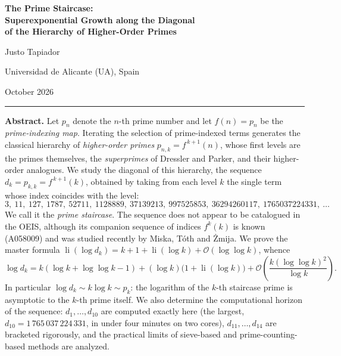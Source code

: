 \documentclass[11pt,a4paper]{article}
\theoremstyle{plain}
\theoremstyle{definition}
\newcommand{\li}{\operatorname{li}}
\begin{document}
\begin{center}
  {\LARGE\bfseries The Prime Staircase:\\[4pt]
   Superexponential Growth along the Diagonal\\[2pt]
   of the Hierarchy of Higher-Order Primes\par}
  \vspace{18pt}
  {\large Justo Tapiador\par}
  \vspace{4pt}
  {\normalsize Universidad de Alicante (UA), Spain\par}
  \vspace{10pt}
  {\small October 2026\par}
\end{center}

\vspace{6pt}
\noindent\rule{\textwidth}{0.4pt}
\vspace{4pt}

\noindent\textbf{Abstract.}
Let $p_n$ denote the $n$-th prime number and let $f(n)=p_n$ be the
\emph{prime-indexing map}. Iterating the selection of prime-indexed terms
generates the classical hierarchy of \emph{higher-order primes}
$p_{n,k}=f^{\,k+1}(n)$, whose first levels are the primes themselves, the
\emph{superprimes} of Dressler and Parker, and their higher-order analogues.
We study the diagonal of this hierarchy, the sequence
$d_k=p_{k,k}=f^{\,k+1}(k)$, obtained by taking from each level $k$ the single
term whose index coincides with the level:
\[
  3,\ 11,\ 127,\ 1787,\ 52711,\ 1128889,\ 37139213,\ 997525853,\
  36294260117,\ 1765037224331,\ \ldots
\]
We call it the \emph{prime staircase}. The sequence does not appear to be
catalogued in the OEIS, although its companion sequence of indices
$f^{k}(k)$ is known (A058009) and was studied recently by Miska, T\'oth and
\.Zmija. We prove the master formula
$\li(\log d_k)=k+1+\li(\log k)+\mathcal{O}(\log\log k)$, whence
\[
  \log d_k=k(\log k+\log\log k-1)+(\log k)\bigl(1+\li(\log k)\bigr)
  +\mathcal{O}\!\left(\frac{k(\log\log k)^2}{\log k}\right).
\]
In particular $\log d_k\sim k\log k\sim p_k$: the logarithm of the $k$-th
staircase prime is asymptotic to the $k$-th prime itself. We also determine
the computational horizon of the sequence: $d_1,\dots,d_{10}$ are computed
exactly here (the largest, $d_{10}=1\,765\,037\,224\,331$, in under four
minutes on two cores), $d_{11},\dots,d_{14}$ are bracketed rigorously, and
the practical limits of sieve-based and prime-counting-based methods are
analyzed.
\end{document}
